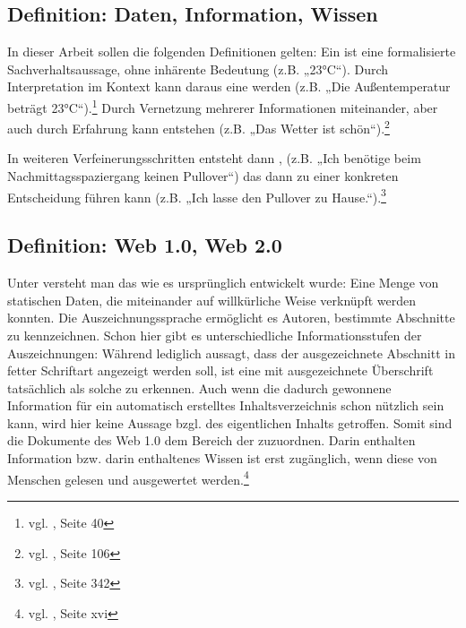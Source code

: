 \subsection{Definition: Daten, Information, Wissen}
\label{defwissen}

In dieser Arbeit sollen die folgenden Definitionen gelten: Ein  ist eine formalisierte Sachverhaltsaussage, ohne inhärente Bedeutung (z.B. „23°C“). Durch Interpretation im Kontext kann daraus eine  werden (z.B. „Die Außentemperatur beträgt 23°C“).\footnote{vgl. \cite{kfk}, Seite 40} Durch Vernetzung mehrerer Informationen miteinander, aber auch durch Erfahrung kann  entstehen (z.B. „Das Wetter ist schön“).\footnote{vgl. \cite{pnik}, Seite 106}

In weiteren Verfeinerungsschritten entsteht dann , (z.B. „Ich benötige beim Nachmittagsspaziergang keinen Pullover“) das dann zu einer konkreten Entscheidung führen kann (z.B. „Ich lasse den Pullover zu Hause.“).\footnote{vgl. \cite{taylor}, Seite 342}

\subsection{Definition: Web 1.0, Web 2.0}

Unter  versteht man das  wie es ursprünglich entwickelt wurde: Eine Menge von statischen Daten, die miteinander auf willkürliche Weise verknüpft werden konnten. Die Auszeichnungssprache  ermöglicht es Autoren, bestimmte Abschnitte zu kennzeichnen. Schon hier gibt es unterschiedliche Informationsstufen der Auszeichnungen: Während  lediglich aussagt, dass der ausgezeichnete Abschnitt in fetter Schriftart angezeigt werden soll, ist eine mit  ausgezeichnete Überschrift tatsächlich als solche zu erkennen. Auch wenn die dadurch gewonnene Information für ein automatisch erstelltes Inhaltsverzeichnis schon nützlich sein kann, wird hier keine Aussage bzgl. des eigentlichen Inhalts getroffen. Somit sind die Dokumente des Web 1.0 dem Bereich der  zuzuordnen. Darin enthalten Information bzw. darin enthaltenes Wissen ist erst zugänglich, wenn diese von Menschen gelesen und ausgewertet werden.\footnote{vgl. \cite{alkhatib}, Seite xvi}


